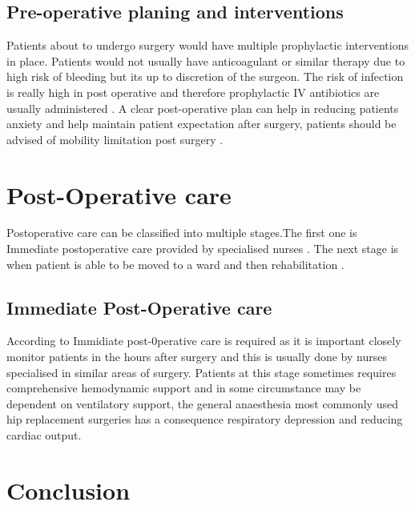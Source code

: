 \documentclass[a4paper,man,british]{apa6}
\begin{document}
\subsection{Pre-operative planing and interventions}

Patients about to undergo surgery would have multiple prophylactic interventions in place. Patients would not usually have anticoagulant  or similar therapy due to high risk of bleeding but its up to discretion of the surgeon. The risk of infection is really high in post operative and therefore prophylactic IV antibiotics are usually administered \parencite{lundine_adherence_2010}.
A clear post-operative plan can help in reducing patients anxiety and help maintain patient expectation after surgery, patients should be advised of mobility limitation post surgery \parencite{mcdonald_preoperative_2014}.




\section{Post-Operative care} %
Postoperative care can be classified into multiple stages.The first one is Immediate postoperative care provided by specialised nurses \parencite{cathy_liddle_postoperative_2013}. The next stage is when patient is able to be moved to a ward and then rehabilitation \parencite{chesser_new_2011}.

\subsection{Immediate Post-Operative care}
 According to \citeauthor{cathy_liddle_postoperative_2013}  Immidiate post-0perative care is required as it is important closely monitor patients in the hours after surgery and this is usually done by nurses specialised in similar areas of surgery. Patients at this stage sometimes requires comprehensive hemodynamic support and in some circumstance may be dependent on ventilatory support, the general anaesthesia most commonly used hip replacement surgeries has a consequence respiratory depression and reducing cardiac output\parencite{BojarRobertM.2010EPC}.
\newpage
\section{Conclusion}%



\printbibliography
\end{document}
